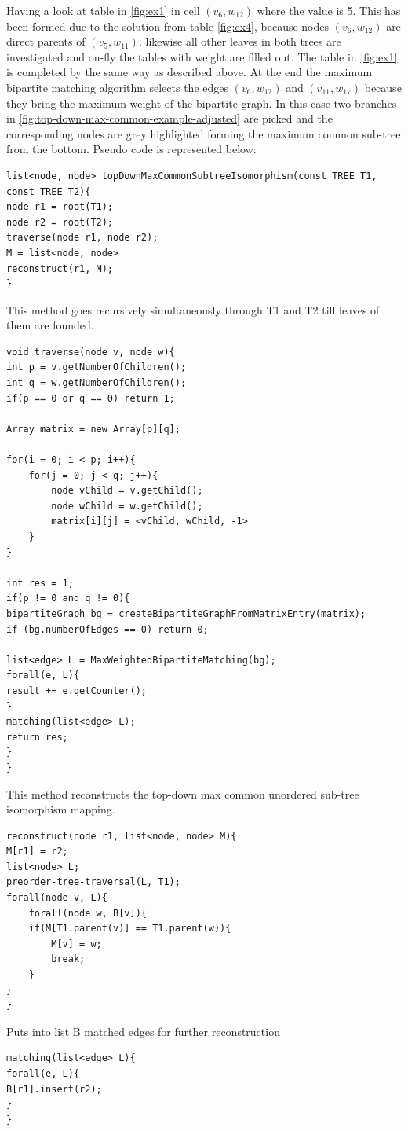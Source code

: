 \documentclass{report}
\begin{document}
Having a look at table in \ref{fig:ex1} in cell $(v_{6},w_{12})$ where the value is 5. This has been formed due to the solution from table \ref{fig:ex4}, because nodes $(v_{6},w_{12})$ are direct parents of $(v_{5},w_{11})$. likewise all other leaves in both trees are investigated and on-fly the tables with weight are filled out. The table in \ref{fig:ex1} is completed by the same way as described above. At the end the maximum bipartite matching algorithm selects the edges $(v_{6},w_{12})$ and $(v_{11},w_{17})$ because they bring the maximum weight of the bipartite graph. In this case two branches in \ref{fig:top-down-max-common-example-adjusted} are picked and the corresponding nodes are grey highlighted forming the maximum common sub-tree from the bottom.
Pseudo code is represented  below:

\begin{lstlisting}
list<node, node> topDownMaxCommonSubtreeIsomorphism(const TREE T1, const TREE T2){
node r1 = root(T1);
node r2 = root(T2);
traverse(node r1, node r2);
M = list<node, node>
reconstruct(r1, M);
}
\end{lstlisting}

This method goes recursively simultaneously through T1 and T2 till leaves of them are founded.
\begin{lstlisting}
void traverse(node v, node w){
int p = v.getNumberOfChildren();
int q = w.getNumberOfChildren();
if(p == 0 or q == 0) return 1;

Array matrix = new Array[p][q];

for(i = 0; i < p; i++){
	for(j = 0; j < q; j++){
		node vChild = v.getChild();	
		node wChild = w.getChild();
		matrix[i][j] = <vChild, wChild, -1>
	}
}

int res = 1;
if(p != 0 and q != 0){
bipartiteGraph bg = createBipartiteGraphFromMatrixEntry(matrix);
if (bg.numberOfEdges == 0) return 0;

list<edge> L = MaxWeightedBipartiteMatching(bg);
forall(e, L){
result += e.getCounter();
}
matching(list<edge> L);
return res;
}
}
\end{lstlisting}
This method reconstructs the top-down max common unordered sub-tree isomorphism mapping.
\begin{lstlisting}
reconstruct(node r1, list<node, node> M){
M[r1] = r2;
list<node> L;
preorder-tree-traversal(L, T1);
forall(node v, L){
	forall(node w, B[v]){
	if(M[T1.parent(v)] == T1.parent(w)){
		M[v] = w;
		break;	
	}
}
}
\end{lstlisting}
Puts into list B matched edges for further reconstruction
\begin{lstlisting}
matching(list<edge> L){
forall(e, L){
B[r1].insert(r2);
}
}
\end{lstlisting}
\end{document}
